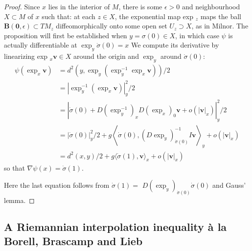 \begin{proof}
	Since \( x \) lies in the interior of \( M \), there is some \( \epsilon > 0 \) and neighbourhood \( X \subset M \) of \( x \) such that: at each \( z \in X \), the exponential map exp \( _ { z } \) maps
	the ball \( \mathbf { B } ( \mathbf { 0 } , \epsilon ) \subset T M _ { z } \) diffeomorphically onto some open set \( U _ { z } \supset X \), as in Milnor.
	The proposition will first be established when
	\( y = \sigma ( 0 ) \in X \), in which case \( \psi \) is actually differentiable at \( \exp _ { y } \dot { \sigma } ( 0 ) = x \)
	We compute its derivative by linearizing exp \( _ { x } \mathbf { v } \in X \) around the origin and $\exp _ { y }$ around $ \dot { \sigma } ( 0 )$:
	\begin{align*}
		\psi \left( \exp _ { x } \mathbf { v } \right) & = d ^ { 2 } \left( y , \exp _ { y } \left( \exp _ { y } ^ { - 1 } \exp _ { x } \mathbf { v } \right) \right) / 2 \\ & = \left| \exp _ { y } ^ { - 1 } \left( \exp _ { x } \mathbf { v } \right) \right| _ { y } ^ { 2 } / 2 \\ & = \left| \dot { \sigma } ( 0 ) + D \left( \exp _ { y } ^ { - 1 } \right) _ { x } D \left( \exp _ { x } \right) _ { 0 } \mathbf { v } + o \left( | \mathbf { v } | _ { x } \right) \right| _ { y } ^ { 2 } / 2 \\ & = | \dot { \sigma } ( 0 ) | _ { y } ^ { 2 } / 2 + g \left\langle \dot { \sigma } ( 0 ) , \left( D \exp _ { y } \right) _ { \dot { \sigma } ( 0 ) } ^ { - 1 } I \mathbf { v } \right\rangle _ { y } + o \left( | \mathbf { v } | _ { x } \right) \\ & = d ^ { 2 } ( x , y ) / 2 + g \langle \dot { \sigma } ( 1 ) , \mathbf { v } \rangle _ { x } + o \left( | \mathbf { v } | _ { x } \right)
	\end{align*}
	so that \( \nabla \psi ( x ) = \dot { \sigma } ( 1 )\).

	Here the last equation follows from \( \dot { \sigma } ( 1 ) = \)
	\( D \left( \exp _ { y } \right) _ { \dot { \sigma } ( 0 ) } \dot { \sigma } ( 0 ) \) and Gauss' lemma.
\end{proof}


\subsection{A Riemannian interpolation inequality à la Borell, Brascamp and Lieb}


